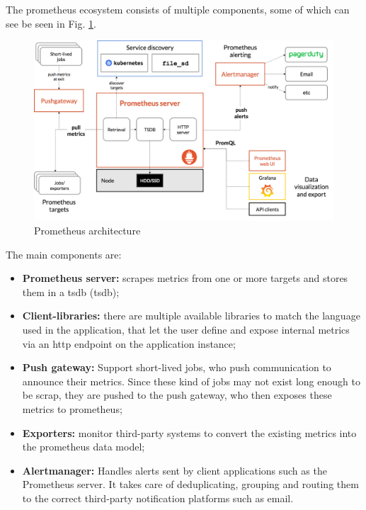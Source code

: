 The prometheus ecosystem consists of multiple components, some of which can see be seen in Fig. \ref{fig:prometheus-architecture}.

\begin{figure}[h]
    \centering
    \includegraphics[width=1\textwidth,clip,trim=0 0 0 0]{Chapters/img/2_background/prometheus-architecture.png}
    \caption{Prometheus architecture~\cite{prometheus-overview}} 
    \label{fig:prometheus-architecture}
\end{figure}

The main components are:

\begin{itemize}
    \item \textbf{Prometheus server:} scrapes metrics from one or more targets and stores them in a \acrlong{tsdb} (\acrshort{tsdb});
    \item \textbf{Client-libraries:} there are multiple available libraries to match the language used in the application, that let the user define and expose internal metrics via an \acrshort{http} endpoint on the application instance;
    \item \textbf{Push gateway:} Support short-lived jobs, who push communication to announce their metrics. Since these kind of jobs may not exist long enough to be scrap, they are pushed to the push gateway, who then exposes these metrics to prometheus; 
    \item \textbf{Exporters:} monitor third-party systems to convert the existing metrics into the prometheus data model;
    \item \textbf{Alertmanager:} Handles alerts sent by client applications such as the Prometheus server. It takes care of deduplicating, grouping and routing them to the correct third-party notification platforms such as email.
    
\end{itemize}


